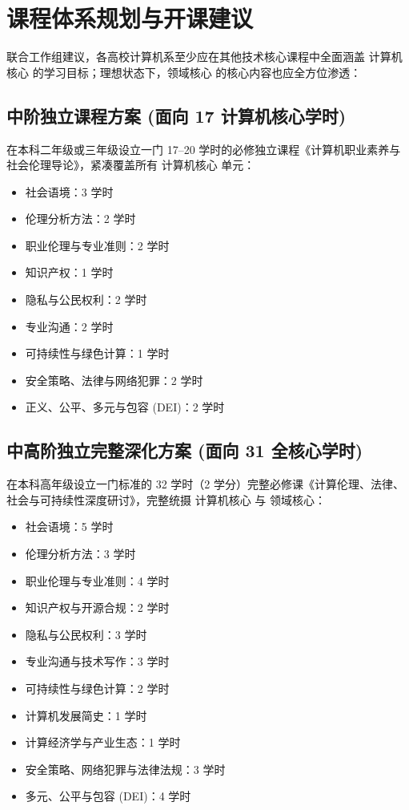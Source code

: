 \section{课程体系规划与开课建议}

联合工作组建议，各高校计算机系至少应在其他技术核心课程中全面涵盖 计算机核心 的学习目标；理想状态下，领域核心 的核心内容也应全方位渗透：

\subsection{中阶独立课程方案 (面向 17 计算机核心学时)}
在本科二年级或三年级设立一门 17--20 学时的必修独立课程《计算机职业素养与社会伦理导论》，紧凑覆盖所有 计算机核心 单元：
\begin{itemize}
    \item 社会语境：3 学时
    \item 伦理分析方法：2 学时
    \item 职业伦理与专业准则：2 学时
    \item 知识产权：1 学时
    \item 隐私与公民权利：2 学时
    \item 专业沟通：2 学时
    \item 可持续性与绿色计算：1 学时
    \item 安全策略、法律与网络犯罪：2 学时
    \item 正义、公平、多元与包容 (DEI)：2 学时
\end{itemize}

\subsection{中高阶独立完整深化方案 (面向 31 全核心学时)}
在本科高年级设立一门标准的 32 学时（2 学分）完整必修课《计算伦理、法律、社会与可持续性深度研讨》，完整统摄 计算机核心 与 领域核心：
\begin{itemize}
    \item 社会语境：5 学时
    \item 伦理分析方法：3 学时
    \item 职业伦理与专业准则：4 学时
    \item 知识产权与开源合规：2 学时
    \item 隐私与公民权利：3 学时
    \item 专业沟通与技术写作：3 学时
    \item 可持续性与绿色计算：2 学时
    \item 计算机发展简史：1 学时
    \item 计算经济学与产业生态：1 学时
    \item 安全策略、网络犯罪与法律法规：3 学时
    \item 多元、公平与包容 (DEI)：4 学时
\end{itemize}

